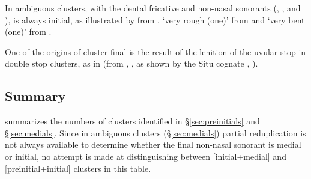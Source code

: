 
In ambiguous clusters, with the dental fricative  and non-nasal sonorants (, ,  and ),  is always initial, as illustrated by  from ,  `very rough (one)' from  and  `very bent (one)' from .

One of the origins of cluster-final  is the result of the lenition of the uvular stop  in double stop clusters, as in  (from , \citealt[330]{jacques04these}, as shown by the Situ cognate , \citealt[603]{huangsun02}).

\subsection{Summary} \label{sec:summary.clusters}
\ADD{\value{2wC}}{\value{2szC}}{\totdeux}
\ADD{\totdeux}{\value{2lC}}{\totdeux}
\ADD{\totdeux}{\value{2rC}}{\totdeux}
\ADD{\totdeux}{\value{2jC}}{\totdeux}
\ADD{\totdeux}{\value{2CZC}}{\totdeux}
\ADD{\totdeux}{\value{2xGC}}{\totdeux}
\ADD{\totdeux}{\value{2XRC}}{\totdeux}
\ADD{\totdeux}{\value{2NC}}{\totdeux}
\ADD{\totdeux}{\value{2mnC}}{\totdeux}
\ADD{\totdeux}{\value{2Cw}}{\totdeux}
\ADD{\totdeux}{\value{2Cj}}{\totdeux}
\ADD{\totdeux}{\value{2Cr}}{\totdeux}
\ADD{\totdeux}{\value{2Cl}}{\totdeux}
\ADD{\totdeux}{\value{2CG}}{\totdeux}
\ADD{\totdeux}{\value{2CR}}{\totdeux}

\ADD{\value{3wC}}{\value{3szC}}{\tottrois}
\ADD{\tottrois}{\value{3lC}}{\tottrois}
\ADD{\tottrois}{\value{3rC}}{\tottrois}
\ADD{\tottrois}{\value{3jC}}{\tottrois}
\ADD{\tottrois}{\value{3CZC}}{\tottrois}
\ADD{\tottrois}{\value{3xGC}}{\tottrois}
\ADD{\tottrois}{\value{3XRC}}{\tottrois}
\ADD{\tottrois}{\value{3NC}}{\tottrois}
\ADD{\tottrois}{\value{3mnC}}{\tottrois}
\ADD{\tottrois}{\value{3Cw}}{\tottrois}
\ADD{\tottrois}{\value{3Cj}}{\tottrois}
\ADD{\tottrois}{\value{3Cr}}{\tottrois}
\ADD{\tottrois}{\value{3Cl}}{\tottrois}
\ADD{\tottrois}{\value{3CG}}{\tottrois}
\ADD{\tottrois}{\value{3CR}}{\tottrois}

  summarizes the numbers of clusters identified in §\ref{sec:preinitials} and §\ref{sec:medials}. Since in ambiguous clusters (§\ref{sec:medials}) partial reduplication is not always available to determine whether the final non-nasal sonorant is medial or initial, no attempt is made at distinguishing between [initial+medial] and [preinitial+initial] clusters in this table.

